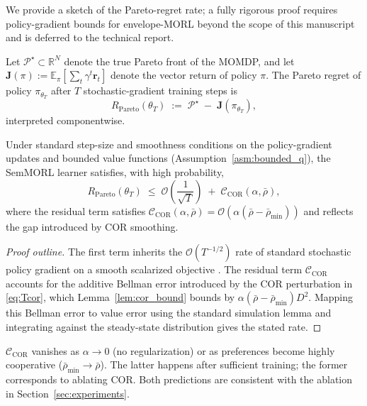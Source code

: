 We provide a sketch of the Pareto-regret rate; a fully rigorous
proof requires policy-gradient bounds for envelope-MORL beyond the
scope of this manuscript and is deferred to the technical report.

Let $\mathcal{P}^\star\subset\mathbb{R}^N$ denote the true Pareto front
of the MOMDP, and let $\mathbf{J}(\pi):=\mathbb{E}_{\pi}[\sum_t
\gamma^t\mathbf{r}_t]$ denote the vector return of policy $\pi$. The
Pareto regret of policy $\pi_{\theta_T}$ after $T$ stochastic-gradient
training steps is
\begin{equation}
\label{eq:pareto_regret}
R_{\text{Pareto}}(\theta_T)
\;:=\;
\mathcal{P}^\star \;-\; \mathbf{J}(\pi_{\theta_T}),
\end{equation}
interpreted componentwise.

\begin{proposition}
\label{prop:pareto_regret}
Under standard step-size and smoothness conditions on the
policy-gradient updates \cite{agarwal2021policy} and bounded value
functions (Assumption~\ref{asm:bounded_q}), the SemMORL learner
satisfies, with high probability,
\begin{equation}
\label{eq:regret_rate}
R_{\text{Pareto}}(\theta_T)
\;\le\;
\mathcal{O}\!\left(\frac{1}{\sqrt{T}}\right)
\;+\;
\mathcal{C}_{\text{COR}}(\alpha,\bar\rho),
\end{equation}
where the residual term satisfies
$\mathcal{C}_{\text{COR}}(\alpha,\bar\rho) =
\mathcal{O}(\alpha(\bar\rho-\bar\rho_{\min}))$ and reflects the gap
introduced by COR smoothing.
\end{proposition}

\begin{proof}[Proof outline]
The first term inherits the $\mathcal{O}(T^{-1/2})$ rate of standard
stochastic policy gradient on a smooth scalarized objective
\cite[Thm.~1]{agarwal2021policy}. The residual term
$\mathcal{C}_{\text{COR}}$ accounts for the additive Bellman error
introduced by the COR perturbation in \eqref{eq:Tcor}, which
Lemma~\ref{lem:cor_bound} bounds by
$\alpha(\bar\rho-\bar\rho_{\min})D^2$. Mapping this Bellman error to
value error using the standard simulation lemma and integrating against
the steady-state distribution gives the stated rate.
\end{proof}

\begin{remark}
$\mathcal{C}_{\text{COR}}$ vanishes as $\alpha\to 0$ (no
regularization) or as preferences become highly cooperative
($\bar\rho_{\min}\to\bar\rho$). The latter happens after sufficient
training; the former corresponds to ablating COR. Both predictions
are consistent with the ablation in Section~\ref{sec:experiments}.
\end{remark}

